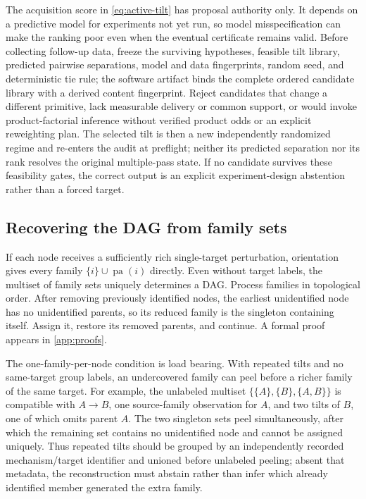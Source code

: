 \documentclass[11pt]{article}
\newcommand{\pa}{\operatorname{pa}}
\begin{document}
The acquisition score in \eqref{eq:active-tilt} has proposal authority only.  It depends on a predictive model for experiments not yet run, so model misspecification can make the ranking poor even when the eventual certificate remains valid.  Before collecting follow-up data, freeze the surviving hypotheses, feasible tilt library, predicted pairwise separations, model and data fingerprints, random seed, and deterministic tie rule; the software artifact binds the complete ordered candidate library with a derived content fingerprint.  Reject candidates that change a different primitive, lack measurable delivery or common support, or would invoke product-factorial inference without verified product odds or an explicit reweighting plan.  The selected tilt is then a new independently randomized regime and re-enters the audit at preflight; neither its predicted separation nor its rank resolves the original multiple-pass state.  If no candidate survives these feasibility gates, the correct output is an explicit experiment-design abstention rather than a forced target.

\subsection{Recovering the DAG from family sets}
\label{sec:graph-recovery}

If each node receives a sufficiently rich single-target perturbation, orientation gives every family \(\{i\}\cup\pa(i)\) directly.  Even without target labels, the multiset of family sets uniquely determines a DAG.  Process families in topological order.  After removing previously identified nodes, the earliest unidentified node has no unidentified parents, so its reduced family is the singleton containing itself.  Assign it, restore its removed parents, and continue.  A formal proof appears in \cref{app:proofs}.

The one-family-per-node condition is load bearing.  With repeated tilts and no same-target group labels, an undercovered family can peel before a richer family of the same target.  For example, the unlabeled multiset \(\{\{A\},\{B\},\{A,B\}\}\) is compatible with \(A\to B\), one source-family observation for \(A\), and two tilts of \(B\), one of which omits parent \(A\).  The two singleton sets peel simultaneously, after which the remaining set contains no unidentified node and cannot be assigned uniquely.  Thus repeated tilts should be grouped by an independently recorded mechanism/target identifier and unioned before unlabeled peeling; absent that metadata, the reconstruction must abstain rather than infer which already identified member generated the extra family.
\end{document}
